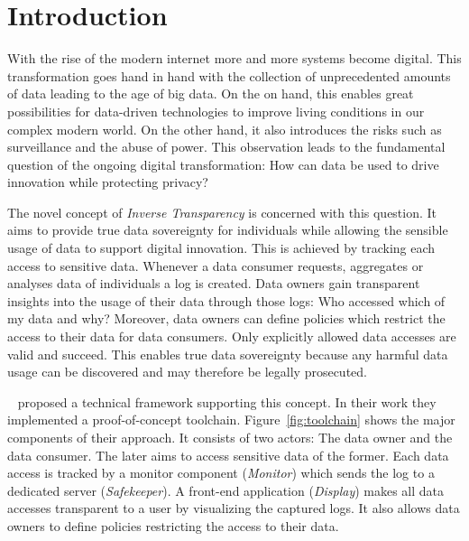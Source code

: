 \documentclass[../main.tex]{subfiles}
\begin{document}
\chapter{Introduction}
With the rise of the modern internet more and more systems become digital.
This transformation goes hand in hand with the collection of unprecedented amounts of data leading to the age of big data.
On the on hand, this enables great possibilities for data-driven technologies to improve living conditions in our complex modern world.
On the other hand, it also introduces the risks such as surveillance and the abuse of power.
This observation leads to the fundamental question of the ongoing digital transformation: How can data be used to drive innovation while protecting privacy?~\cite{Boes2022, Schallmo2016}

The novel concept of \emph{Inverse Transparency} is concerned with this question.
It aims to provide true data sovereignty for individuals while allowing the sensible usage of data to support digital innovation.
This is achieved by tracking each access to sensitive data.
Whenever a data consumer requests, aggregates or analyses data of individuals a log is created.
Data owners gain transparent insights into the usage of their data through those logs:
Who accessed which of my data and why?
Moreover, data owners can define policies which restrict the access to their data for data consumers.
Only explicitly allowed data accesses are valid and succeed.
This enables true data sovereignty because any harmful data usage can be discovered and may therefore be legally prosecuted.~\cite{Boes2022}

\citeauthor{Zieglmeier2021}~\cite{Zieglmeier2021} proposed a technical framework supporting this concept.
In their work they implemented a proof-of-concept toolchain.
Figure~\ref{fig:toolchain} shows the major components of their approach.
It consists of two actors: The data owner and the data consumer.
The later aims to access sensitive data of the former.
Each data access is tracked by a monitor component (\emph{Monitor}) which sends the log to a dedicated server (\emph{Safekeeper}).
A front-end application (\emph{Display}) makes all data accesses transparent to a user by visualizing the captured logs.
It also allows data owners to define policies restricting the access to their data.
\end{document}
